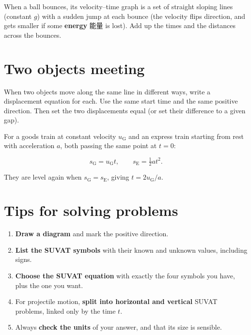 \documentclass[11pt]{article}
\begin{document}
When a ball bounces, its velocity–time graph is a set of straight sloping lines (constant $g$) with a sudden jump at each bounce (the velocity flips direction, and gets smaller if some \textbf{energy} 能量 is lost). Add up the times and the distances across the bounces.

\section*{Two objects meeting}

When two objects move along the same line in different ways, write a displacement equation for each. Use the same start time and the same positive direction. Then set the two displacements equal (or set their difference to a given gap).

For a goods train at constant velocity $u_{\text{G}}$ and an express train starting from rest with acceleration $a$, both passing the same point at $t = 0$:

\[
s_{\text{G}} = u_{\text{G}} t, \qquad s_{\text{E}} = \tfrac{1}{2} a t^{2}.
\]

They are level again when $s_{\text{G}} = s_{\text{E}}$, giving $t = 2 u_{\text{G}} / a$.

\section*{Tips for solving problems}

\begin{enumerate}
\item \textbf{Draw a diagram} and mark the positive direction.

\item \textbf{List the SUVAT symbols} with their known and unknown values, including signs.

\item \textbf{Choose the SUVAT equation} with exactly the four symbols you have, plus the one you want.

\item For projectile motion, \textbf{split into horizontal and vertical} SUVAT problems, linked only by the time $t$.

\item Always \textbf{check the units} of your answer, and that its size is sensible.

\end{enumerate}
\end{document}

